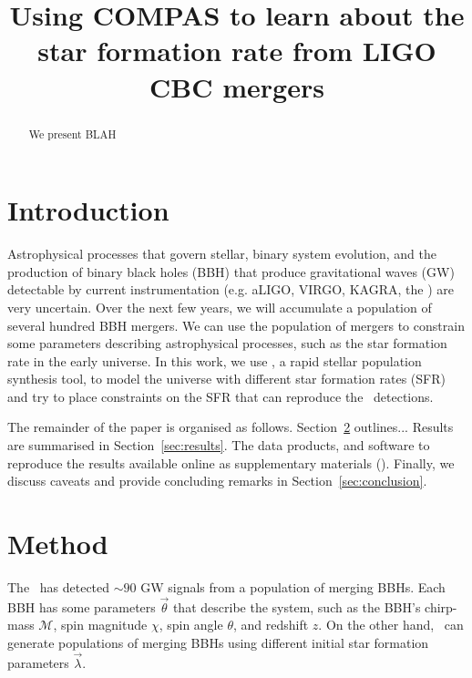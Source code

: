 \documentclass[floatfix,ApJL,twocolumn]{aastex631}
\begin{document}
\title{Using COMPAS to learn about the star formation rate from LIGO CBC mergers}







\begin{abstract}
We present BLAH
\end{abstract}




\section{Introduction} \label{sec:intro}

Astrophysical processes that govern stellar, binary system evolution, and the production of binary black holes (BBH) that produce gravitational waves (GW) detectable by current instrumentation (e.g. aLIGO, VIRGO, KAGRA, the \lvk) are very uncertain.
Over the next few years, we will accumulate a population of several hundred BBH mergers.
We can use the population of mergers to constrain some parameters describing astrophysical processes, such as the star formation rate in the early universe.
In this work, we use \compas, a rapid stellar population synthesis tool, to model the universe with different star formation rates (SFR) and try to place constraints on the SFR that can reproduce the \lvk\ detections.


The remainder of the paper is organised as follows.
Section~\ref{sec:method} outlines...
Results are summarised in Section~\ref{sec:results}.
The data products, and software to reproduce the results available online as supplementary materials (\projectUrl).
Finally, we discuss caveats and provide concluding remarks in Section~\ref{sec:conclusion}.

\section{Method} \label{sec:method}


The \lvk\ has detected $\sim90$ GW signals from a population of merging BBHs.
Each BBH has some parameters $\vec{\theta}$ that describe the system, such as the BBH's chirp-mass $\mathcal{M}$, spin magnitude $\chi$, spin angle $\theta$, and redshift $z$.
On the other hand, \compas\ can generate populations of merging BBHs using different initial star formation parameters $\vec{\lambda}$.
\end{document}
